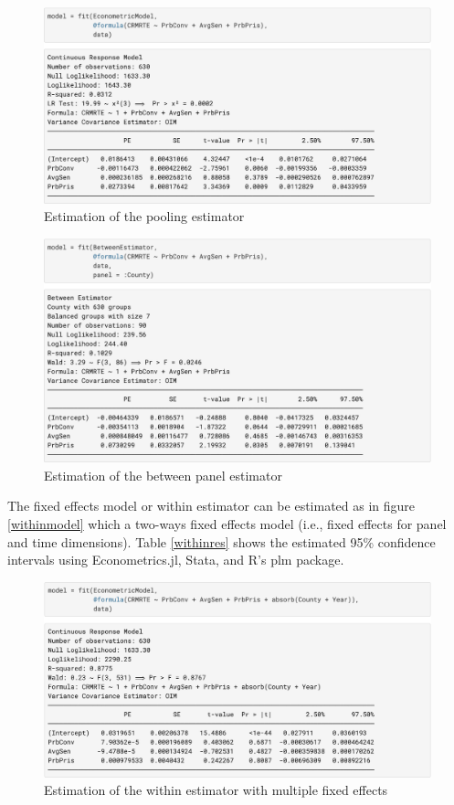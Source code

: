 \documentclass{juliacon}
\begin{document}
\begin{figure}[hbpt]
    \includegraphics[max width=\linewidth,center]{estimator_pooling}
	\caption{Estimation of the pooling estimator}
	\label{estimator_pooling}
\end{figure}

\begin{figure}[hbpt]
    \includegraphics[max width=\linewidth,center]{estimator_between}
	\caption{Estimation of the between panel estimator}
	\label{estimator_between}
\end{figure}

The fixed effects model or within estimator can be estimated as in figure \vref{withinmodel} which a two-ways fixed effects model (i.e., fixed effects for panel and time dimensions). Table \vref{withinres} shows the estimated 95\% confidence intervals using Econometrics.jl, Stata, and R's plm package.

\begin{figure}[hbpt]
	\includegraphics[max width=\linewidth,center]{estimator_fe}
	\caption{Estimation of the within estimator with multiple fixed effects}
	\label{withinmodel}
\end{figure}
\end{document}
